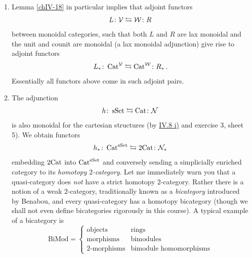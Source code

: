 \begin{enumerate}[label=\roman*)]
            \item 
                Lemma \ref{chIV-18} in particular implies that adjoint functors
                \begin{equation*}
                    L \colon \mathcal{V} \leftrightarrows \mathcal{W} \colon R
                \end{equation*}
                between monoidal categories, such that both $L$ and $R$ are lax monoidal and the unit and counit are monoidal (a lax monoidal adjunction\footnotemark) give rise to adjoint functors
                \begin{equation*}
                    L_{*} \colon \operatorname{Cat}^{\mathcal{V}} \leftrightarrows \operatorname{Cat}^{\mathcal{W}} \colon R_{*} \,.
                \end{equation*}
                Essentially all functors above come in such adjoint pairs.
            \item 
                The adjunction
                \begin{equation*}
                    h \colon \operatorname{sSet} \leftrightarrows \operatorname{Cat} \colon \mathcal{N}
                \end{equation*}
                is also monoidal for the cartesian structures (by \hyperref[chIV-8-i]{IV.8 i)} and exercise 3, sheet 5). We obtain functors
                \begin{equation*}
                    h_{*} \colon \operatorname{Cat}^{\operatorname{sSet}} \leftrightarrows \mathrm{2Cat} \colon \mathcal{N}_{*}
                \end{equation*}
                embedding $\mathrm{2Cat}$ into $\operatorname{Cat}^{\operatorname{sSet}}$ and conversely sending a simplicially enriched category to its \emph{homotopy $2$-category}. Let me immediately warn you that a quasi-category does \emph{not} have a strict homotopy $2$-category. Rather there is a notion of a weak $2$-category, traditionally known as a \emph{bicategory} introduced by Benabou, and every quasi-category has a homotopy bicategory (though we shall not even define bicategories rigorously in this course). A typical example of a bicategory is
                \begin{equation*}
                    \text{BiMod} =
                    \begin{cases*}
                        \text{objects}     & \text{rings} \\
                        \text{morphisms}   & \text{bimodules} \\
                        \text{2-morphisms} & \text{bimodule homomorphisms}
                    \end{cases*}

\end{equation*}
\end{enumerate}
